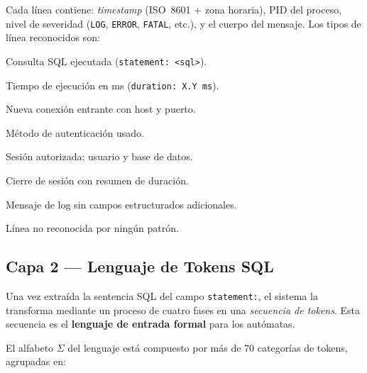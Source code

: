 \documentclass[12pt, a4paper]{report}
\theoremstyle{definition}
\theoremstyle{remark}
\begin{document}
Cada línea contiene: \emph{timestamp} (ISO~8601 + zona horaria), PID del proceso,
nivel de severidad (\texttt{LOG}, \texttt{ERROR}, \texttt{FATAL}, etc.),
y el cuerpo del mensaje. Los tipos de línea reconocidos son:

\begin{description}[leftmargin=3cm, labelindent=0.5cm]
  \item[\texttt{Statement}] Consulta SQL ejecutada (\texttt{statement: <sql>}).
  \item[\texttt{Duration}]  Tiempo de ejecución en ms (\texttt{duration: X.Y ms}).
  \item[\texttt{ConnectionReceived}] Nueva conexión entrante con host y puerto.
  \item[\texttt{ConnectionAuthenticated}] Método de autenticación usado.
  \item[\texttt{ConnectionAuthorized}]   Sesión autorizada: usuario y base de datos.
  \item[\texttt{Disconnection}] Cierre de sesión con resumen de duración.
  \item[\texttt{General}] Mensaje de log sin campos estructurados adicionales.
  \item[\texttt{Unknown}] Línea no reconocida por ningún patrón.
\end{description}

\subsection{Capa 2 — Lenguaje de Tokens SQL}

Una vez extraída la sentencia SQL del campo \texttt{statement:}, el sistema la
transforma mediante un proceso de cuatro fases en una \emph{secuencia de tokens}.
Esta secuencia es el \textbf{lenguaje de entrada formal} para los autómatas.

El alfabeto $\Sigma$ del lenguaje está compuesto por más de 70 categorías de
tokens, agrupadas en:
\end{document}
